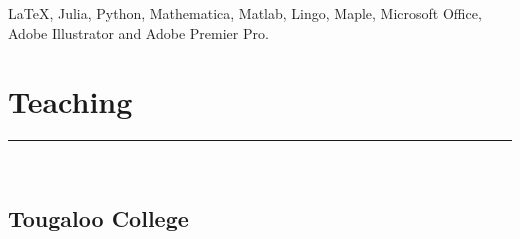 \documentclass[12pt]{book}
\begin{document}
\LaTeX, Julia, Python, Mathematica, Matlab, Lingo, Maple, Microsoft Office, Adobe Illustrator and Adobe Premier Pro. \\


\section*{Teaching}
\rule{\textwidth}{1pt}\\






\subsection*{Tougaloo College}
	\vspace{1em}
\end{document}
